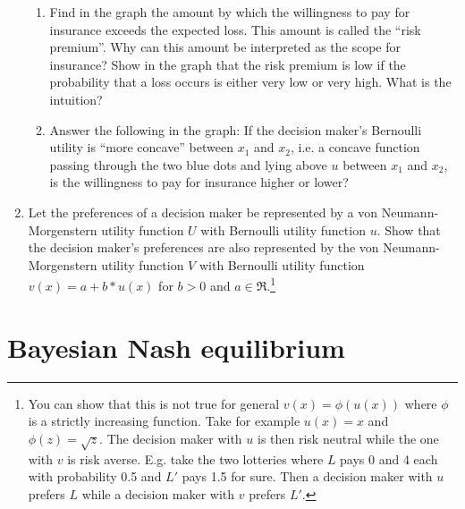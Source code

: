 \documentclass[a4paper,12pt]{article}
\begin{document}
\begin{enumerate}
\begin{enumerate}
  \item Find in the graph the amount by which the willingness to pay for insurance exceeds the expected loss. This amount is called the ``risk premium''. Why can this amount be interpreted as the scope for insurance? Show in the graph that the risk premium is low if the probability that a loss occurs is either very low or very high. What is the intuition?
  \item Answer the following in the graph: If the decision maker's Bernoulli utility is ``more concave'' between $x_1$  and $x_2$, i.e. a concave function passing through the two blue dots and lying above $u$ between $x_1$ and $x_2$, is the willingness to pay for insurance higher or lower?
  \end{enumerate}
  \item Let the preferences of a decision maker be represented by a von Neumann-Morgenstern utility function $U$ with Bernoulli utility function $u$. Show that the decision maker's preferences are also represented by the von Neumann-Morgenstern utility function $V$ with Bernoulli utility function $v(x)=a+b*u(x)$ for $b>0$ and $a\in \Re$.\footnote{You can show that this is not true for general $v(x)=\phi(u(x))$ where $\phi$ is a strictly increasing function. Take for example $u(x)=x$ and $\phi(z)=\sqrt{z}$. The decision maker with $u$ is then risk neutral while the one with $v$ is risk averse. E.g. take the two lotteries where $L$ pays 0 and 4 each with probability 0.5 and $L'$ pays 1.5 for sure. Then a decision maker with $u$ prefers $L$ while a decision maker with $v$ prefers $L'$. } 
\end{enumerate}

\section{Bayesian Nash equilibrium}
\label{sec:bayes-nash-equil}
\end{document}
